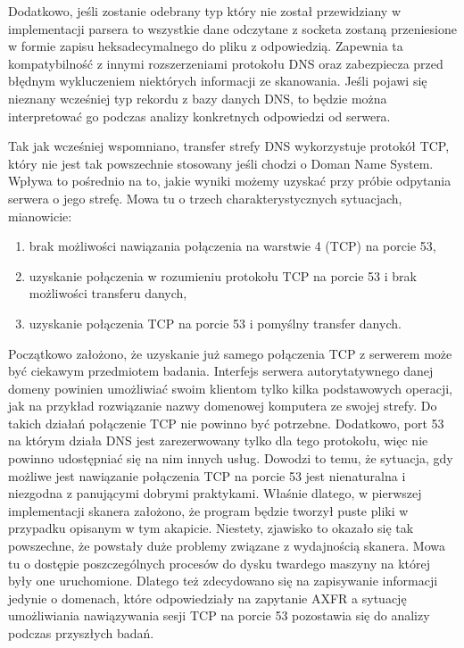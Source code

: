 Dodatkowo, jeśli zostanie odebrany typ który nie został przewidziany w implementacji parsera to wszystkie dane odczytane z socketa zostaną przeniesione w formie zapisu heksadecymalnego do pliku z odpowiedzią. Zapewnia ta kompatybilność z innymi rozszerzeniami protokołu DNS oraz zabezpiecza przed błędnym wykluczeniem niektórych informacji ze skanowania. Jeśli pojawi się nieznany wcześniej typ rekordu z bazy danych DNS, to będzie można interpretować go podczas analizy konkretnych odpowiedzi od serwera.

Tak jak wcześniej wspomniano, transfer strefy DNS wykorzystuje protokół TCP, który nie jest tak powszechnie stosowany jeśli chodzi o Doman Name System. Wpływa to pośrednio na to, jakie wyniki możemy uzyskać przy próbie odpytania serwera o jego strefę. Mowa tu o trzech charakterystycznych sytuacjach, mianowicie:
\begin{enumerate}
	\item brak możliwości nawiązania połączenia na warstwie 4 (TCP) na porcie 53,
	\item uzyskanie połączenia w rozumieniu protokołu TCP na porcie 53 i brak możliwości transferu danych,
	\item uzyskanie połączenia TCP na porcie 53 i pomyślny transfer danych.
\end{enumerate}

Początkowo założono, że uzyskanie już samego połączenia TCP z serwerem może być ciekawym przedmiotem badania. Interfejs serwera autorytatywnego danej domeny powinien umożliwiać swoim klientom tylko kilka podstawowych operacji, jak na przykład rozwiązanie nazwy domenowej komputera ze swojej strefy. Do takich działań połączenie TCP nie powinno być potrzebne. Dodatkowo, port 53 na którym działa DNS jest zarezerwowany tylko dla tego protokołu, więc nie powinno udostępniać się na nim innych usług. Dowodzi to temu, że sytuacja, gdy możliwe jest nawiązanie połączenia TCP na porcie 53 jest nienaturalna i niezgodna z panującymi dobrymi praktykami. Właśnie dlatego, w pierwszej implementacji skanera założono, że program będzie tworzył puste pliki w przypadku opisanym w tym akapicie. Niestety, zjawisko to okazało się tak powszechne, że powstały duże problemy związane z wydajnością skanera. Mowa tu o dostępie poszczególnych procesów do dysku twardego maszyny na której były one uruchomione. Dlatego też zdecydowano się na zapisywanie informacji jedynie o domenach, które odpowiedziały na zapytanie AXFR a sytuację umożliwiania nawiązywania sesji TCP na porcie 53 pozostawia się do analizy podczas przyszłych badań.

